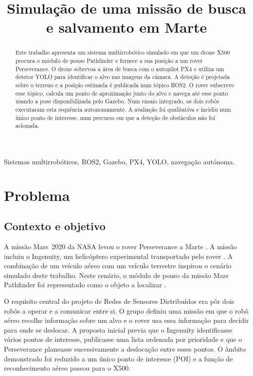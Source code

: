 \documentclass[conference]{IEEEtran}
\title{Simulação de uma missão de busca e salvamento em Marte}
\author{\IEEEauthorblockN{Alexandre Coelho e Gonçalo Noronha}
\IEEEauthorblockA{Instituto Superior de Engenharia do Porto\\
Porto, Portugal}}
\begin{document}
\maketitle

\begin{abstract}
Este trabalho apresenta um sistema multirrobótico simulado em que um drone X500 procura o módulo de pouso Pathfinder e fornece a sua posição a um rover Perseverance. O drone sobrevoa a área de busca com o autopilot PX4 e utiliza um detetor YOLO para identificar o alvo nas imagens da câmara. A deteção é projetada sobre o terreno e a posição estimada é publicada num tópico ROS2. O rover subscreve esse tópico, calcula um ponto de aproximação junto do alvo e navega até esse ponto usando a pose disponibilizada pelo Gazebo. Num ensaio integrado, os dois robôs executaram esta sequência autonomamente. A avaliação foi qualitativa e incidiu num único ponto de interesse, num percurso em que a deteção de obstáculos não foi acionada.
\end{abstract}

\begin{IEEEkeywords}
Sistemas multirrobóticos, ROS2, Gazebo, PX4, YOLO, navegação autónoma.
\end{IEEEkeywords}

\section{Problema}
\subsection{Contexto e objetivo}

A missão Mars~2020 da NASA levou o rover Perseverance a Marte \cite{farley2020,nasa-perseverance}. A missão incluiu o Ingenuity, um helicóptero experimental transportado pelo rover \cite{balaram2021,nasa-ingenuity}. A combinação de um veículo aéreo com um veículo terrestre inspirou o cenário simulado deste trabalho. Neste cenário, o módulo de pouso da missão Mars Pathfinder foi representado como o objeto a localizar \cite{golombek1997,nasa-pathfinder}.

O requisito central do projeto de Redes de Sensores Distribuídos era pôr dois robôs a operar e a comunicar entre si. O grupo definiu uma missão em que o robô aéreo recolhe informação sobre um alvo e o rover usa essa informação para decidir para onde se deslocar. A proposta inicial previa que o Ingenuity identificasse vários pontos de interesse, publicasse uma lista ordenada por prioridade e que o Perseverance planeasse sucessivamente a deslocação entre esses pontos. O âmbito demonstrado foi reduzido a um único ponto de interesse (POI) e a função de reconhecimento aéreo passou para o X500.
\end{document}
